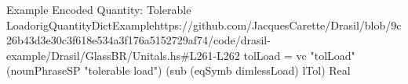 \begin{haskell}{Example Encoded Quantity: Tolerable Load}{origQuantityDictExample}{https://github.com/JacquesCarette/Drasil/blob/9c26b43d3e30c3f618e534a3f176a5152729af74/code/drasil-example/Drasil/GlassBR/Unitals.hs\#L261-L262}
tolLoad = vc "tolLoad" (nounPhraseSP "tolerable load")
    (sub (eqSymb dimlessLoad) lTol) Real
\end{haskell}
